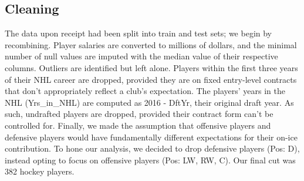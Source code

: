 \documentclass[10pt]{article}
\begin{document}
\subsection{Cleaning}
The data upon receipt had been split into train and test sets; we begin by recombining. Player salaries are converted to millions of dollars, and the minimal number of null values are imputed with the median value of their respective columns. Outliers are identified but left alone. Players within the first three years of their NHL career are dropped, provided they are on fixed entry-level contracts that don’t appropriately reflect a club’s expectation. The players' years in the NHL (Yrs\_in\_NHL) are computed as 2016 - DftYr, their original draft year. As such, undrafted players are dropped, provided their contract form can’t be controlled for. Finally, we made the assumption that offensive players and defensive players would have fundamentally different expectations for their on-ice contribution. To hone our analysis, we decided to drop defensive players (Pos: D), instead opting to focus on offensive players (Pos: LW, RW, C). Our final cut was 382 hockey players.
\end{document}
